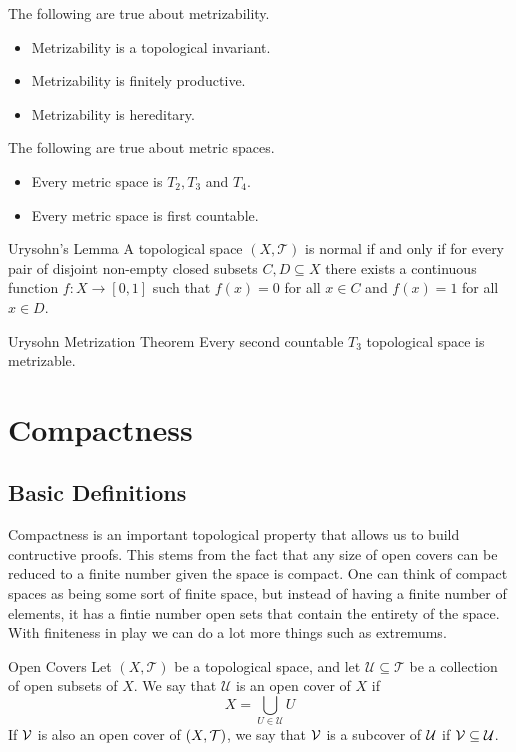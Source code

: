 \documentclass[a4paper]{article}
\begin{document}
\begin{prp}{}{} The following are true about metrizability. 
\begin{itemize}
\item Metrizability is a topological invariant. 
\item Metrizability is finitely productive. 
\item Metrizability is hereditary. 
\end{itemize}
\end{prp}

\begin{prp}{}{} The following are true about metric spaces. 
\begin{itemize}
\item Every metric space is $T_2,T_3$ and $T_4$. 
\item Every metric space is first countable. 
\end{itemize}
\end{prp}

\begin{thm}{Urysohn's Lemma}{} A topological space $(X,\mathcal{T})$ is normal if and only if for every pair of disjoint non-empty closed subsets $C,D\subseteq X$ there exists a continuous function $f:X\to[0,1]$ such that $f(x)=0$ for all $x\in C$ and $f(x)=1$ for all $x\in D$. 
\end{thm}

\begin{thm}{Urysohn Metrization Theorem}{} Every second countable $T_3$ topological space is metrizable. 
\end{thm}

\pagebreak
\section{Compactness}
\subsection{Basic Definitions}
Compactness is an important topological property that allows us to build contructive proofs. This stems from the fact that any size of open covers can be reduced to a finite number given the space is compact. One can think of compact spaces as being some sort of finite space, but instead of having a finite number of elements, it has a fintie number open sets that contain the entirety of the space. With finiteness in play we can do a lot more things such as extremums. 

\begin{defn}{Open Covers}{} Let $(X,\mathcal{T})$ be a topological space, and let $\mathcal{U}\subseteq\mathcal{T}$ be a collection of open subsets of $X$. We say that $\mathcal{U}$ is an open cover of $X$ if $$X=\bigcup_{U\in\mathcal{U}}U$$ If $\mathcal{V}$ is also an open cover of $(X,\mathcal{T})$, we say that $\mathcal{V}$ is a subcover of $\mathcal{U}$ if $\mathcal{V}\subseteq\mathcal{U}$. 
\end{defn}
\end{document}
